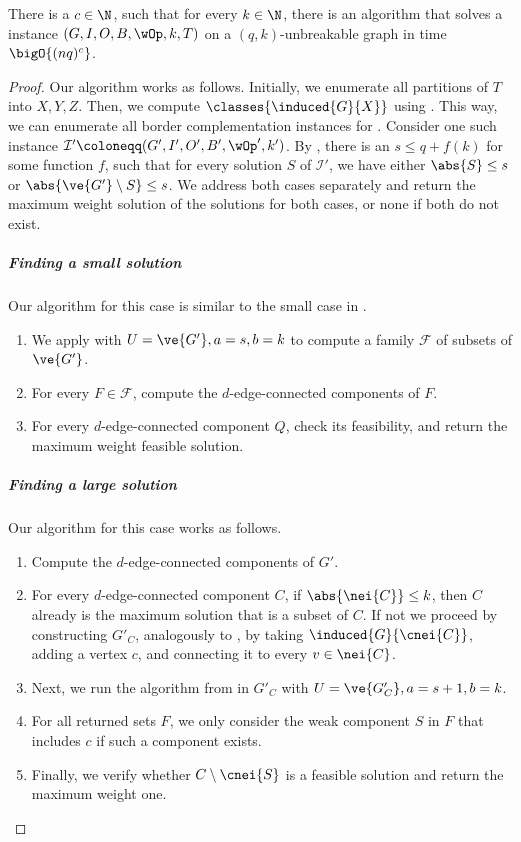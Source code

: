 \begin{lemma}
\begin{lemma}
\begin{lemma}
\begin{lemma}
\begin{lemma}
\iflong
\begin{theorem}
\else
\begin{theorem}[$\star$]
\fi
  There is a $c \in \N$, such that for every $k \in \N$, there is an algorithm that solves a \probborder{} instance $(G,I,O,B,\wOp,k,T)$ on a $(q,k)$-unbreakable graph in time $\bigO{(nq)^c}$.
\end{theorem}
\iflong
\begin{proof}
  Our algorithm works as follows. Initially, we enumerate all partitions of $T$ into $X,Y,Z$. Then, we compute $\classes{\induced{G}{X}}$ using . This way, we can enumerate all border complementation instances for \probrec{}. Consider one such instance $\mathcal{I'} \coloneqq (G', I', O', B', \wOp', k')$. By , there is an $s \le q + f(k)$ for some function $f$, such that for every solution $S$ of $\mathcal{I'}$, we have either $\abs{S} \le s$ or $\abs{\ve{G'} \setminus S} \le s$. We address both cases separately and return the maximum weight solution of the solutions for both cases, or none if both do not exist.

  \subparagraph*{Finding a small solution} Our algorithm for this case is similar to the small case in .
  \begin{enumerate}
    \item We apply  with $U = \ve{G'}, a = s, b = k$ to compute a family $\mathcal{F}$ of subsets of $\ve{G'}$.
    \item For every $F \in \mathcal{F}$, compute the $d$-edge-connected components of $F$.
    \item For every $d$-edge-connected component $Q$, check its feasibility, and return the maximum weight feasible solution.
  \end{enumerate}

  \subparagraph*{Finding a large solution} Our algorithm for this case works as follows.
  \begin{enumerate}
    \item Compute the $d$-edge-connected components of $G'$.
    \item For every $d$-edge-connected component $C$, if $\abs{\nei{C}} \le k$, then $C$ already is the maximum solution that is a subset of $C$. If not we proceed by constructing $G'_C$, analogously to , by taking $\induced{G}{\cnei{C}}$, adding a vertex $c$, and connecting it to every $v \in \nei{C}$.
    \item Next, we run the algorithm from  in $G'_C$ with $U = \ve{G'_C}, a = s+1, b = k$.
    \item For all returned sets $F$, we only consider the weak component $S$ in $F$ that includes $c$ if such a component exists.
    \item Finally, we verify whether $C \setminus \cnei{S}$ is a feasible solution and return the maximum weight one.
  \end{enumerate}


\end{proof}
\end{theorem}
\end{lemma}
\end{lemma}
\end{lemma}
\end{lemma}
\end{lemma}
